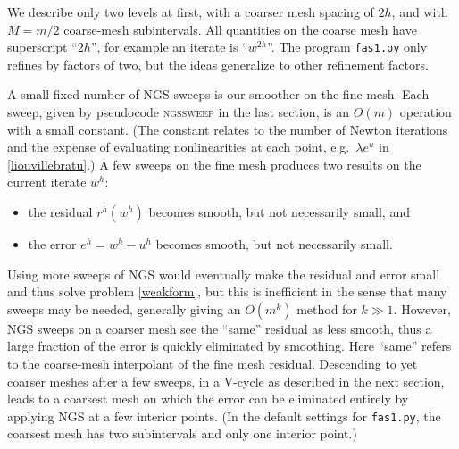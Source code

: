 \documentclass[letterpaper,final,12pt,reqno]{amsart}
\begin{document}
We describe only two levels at first, with a coarser mesh spacing of $2h$, and with $M=m/2$ coarse-mesh subintervals.  All quantities on the coarse mesh have superscript ``$2h$'', for example an iterate is ``$w^{2h}$''.  The program \texttt{fas1.py} only refines by factors of two, but the ideas generalize to other refinement factors.

A small fixed number of NGS sweeps is our smoother on the fine mesh.  Each sweep, given by pseudocode \textsc{ngssweep} in the last section, is an $O(m)$ operation with a small constant.  (The constant relates to the number of Newton iterations and the expense of evaluating nonlinearities at each point, e.g.~$\lambda e^u$ in \eqref{liouvillebratu}.)  A few sweeps on the fine mesh produces two results on the current iterate $w^h$:
\begin{itemize}
\item the residual $r^h(w^h)$ becomes smooth, but not necessarily small, and
\item the error $e^h = w^h - u^h$ becomes smooth, but not necessarily small.
\end{itemize}

Using more sweeps of NGS would eventually make the residual and error small and thus solve problem \eqref{weakform}, but this is inefficient in the sense that many sweeps may be needed, generally giving an $O(m^k)$ method for $k\gg 1$.  However, NGS sweeps on a coarser mesh see the ``same'' residual as less smooth, thus a large fraction of the error is quickly eliminated by smoothing.  Here ``same'' refers to the coarse-mesh interpolant of the fine mesh residual.  Descending to yet coarser meshes after a few sweeps, in a V-cycle as described in the next section, leads to a coarsest mesh on which the error can be eliminated entirely by applying NGS at a few interior points.  (In the default settings for \texttt{fas1.py}, the coarsest mesh has two subintervals and only one interior point.)
\end{document}

